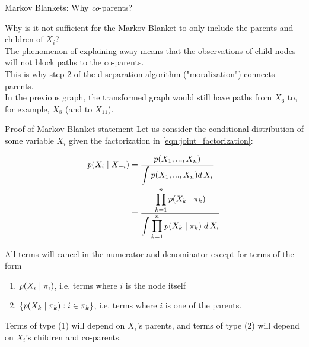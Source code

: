 \documentclass[10pt]{beamer}
\begin{document}
\begin{frame}{Markov Blankets: Why \textit{co}-parents?}

Why is it not sufficient for the Markov Blanket to only include the parents and children of $X_i$? \\
\pause
\vfill
The phenomenon of \alert{explaining away} means that the observations of child nodes will not block paths to the co-parents. \pause  \\
\vfill
This is why step 2 of the d-separation algorithm ("moralization") connects parents. \\
\vfill
In the previous graph, the transformed graph would still have paths from $X_6$ to, for example, $X_8$ (and to $X_{11}$).
\end{frame}

\begin{frame}{Proof of Markov Blanket statement}
Let us consider the conditional distribution of some variable $X_i$ given the factorization in \eqref{eqn:joint_factorization}:

\begin{align*}
 p(X_i  \; | \; X_{-i}) &= \displaystyle\frac{ p(X_1, ..., X_n)}{ \displaystyle\int  p(X_1, ..., X_n) d\, X_i} \\
 &= \displaystyle\frac{\displaystyle\prod_{k=1}^n p(X_k \; | \; \pi_k)}{\displaystyle\int \displaystyle\prod_{k=1}^n p(X_k \; | \; \pi_k) \; d\,X_i }
 \end{align*}
 
All terms will cancel in the numerator and denominator except for terms of the form
\begin{enumerate}
\item $p(X_i \; | \; \pi_i)$, i.e. terms where $i$ is the node itself
\item $\{p(X_k \; | \; \pi_k) : i \in \pi_k \} $, i.e. terms where $i$ is one of the parents.
\end{enumerate}

Terms of type (1) will depend on $X_i$'s parents, and terms of type (2) will depend on $X_i$'s children and co-parents.

\end{frame}
 
\end{document}
